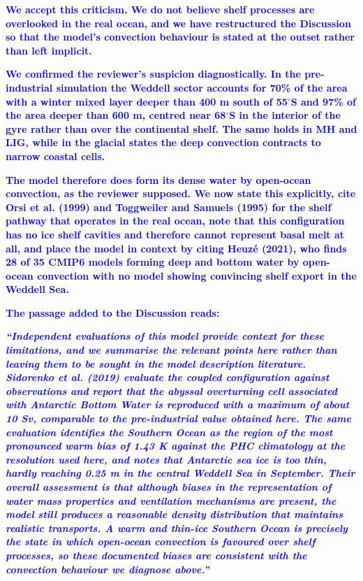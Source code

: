 \documentclass[pdflatex,sn-nature]{sn-jnl}
\begin{document}
\noindent\textcolor{blue}{\textbf{We accept this criticism. We do not believe shelf processes are overlooked in the real ocean, and we have restructured the Discussion so that the model's convection behaviour is stated at the outset rather than left implicit.}}


\noindent\textcolor{blue}{\textbf{We confirmed the reviewer's suspicion diagnostically. In the pre-industrial simulation the Weddell sector accounts for 70\% of the area with a winter mixed layer deeper than 400 m south of 55$^\circ$S and 97\% of the area deeper than 600 m, centred near 68$^\circ$S in the interior of the gyre rather than over the continental shelf. The same holds in MH and LIG, while in the glacial states the deep convection contracts to narrow coastal cells.}}


\noindent\textcolor{blue}{\textbf{The model therefore does form its dense water by open-ocean convection, as the reviewer supposed. We now state this explicitly, cite Orsi et al. (1999) and Toggweiler and Samuels (1995) for the shelf pathway that operates in the real ocean, note that this configuration has no ice shelf cavities and therefore cannot represent basal melt at all, and place the model in context by citing Heuz\'e (2021), who finds 28 of 35 CMIP6 models forming deep and bottom water by open-ocean convection with no model showing convincing shelf export in the Weddell Sea.}}


\noindent\textcolor{blue}{\textbf{The passage added to the Discussion reads:}}


\medskip
\noindent\textcolor{blue}{\textbf{\textit{``Independent evaluations of this model provide context for these limitations, and we summarise the relevant points here rather than leaving them to be sought in the model description literature. Sidorenko et al. (2019) evaluate the coupled configuration against observations and report that the abyssal overturning cell associated with Antarctic Bottom Water is reproduced with a maximum of about 10 Sv, comparable to the pre-industrial value obtained here. The same evaluation identifies the Southern Ocean as the region of the most pronounced warm bias of 1.43 K against the PHC climatology at the resolution used here, and notes that Antarctic sea ice is too thin, hardly reaching 0.25 m in the central Weddell Sea in September. Their overall assessment is that although biases in the representation of water mass properties and ventilation mechanisms are present, the model still produces a reasonable density distribution that maintains realistic transports. A warm and thin-ice Southern Ocean is precisely the state in which open-ocean convection is favoured over shelf processes, so these documented biases are consistent with the convection behaviour we diagnose above.''}}}
\medskip
\end{document}
